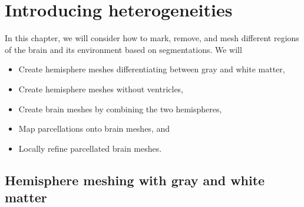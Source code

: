 \chapter{Introducing heterogeneities}
\label{chp:chp4}

In this chapter, we will consider how to mark, remove, and mesh
different regions of the brain and its environment based on
{\freesurfer} segmentations. We will
\begin{itemize}
\item
  Create hemisphere meshes differentiating between gray and white matter,
\item
  Create hemisphere meshes without ventricles,
\item
  Create brain meshes by combining the two hemispheres,
\item
  Map parcellations onto brain meshes, and
\item
  Locally refine parcellated brain meshes.
\end{itemize}

\section{Hemisphere meshing with gray and white matter}
\label{sec:chp4:tools:gray-white}

